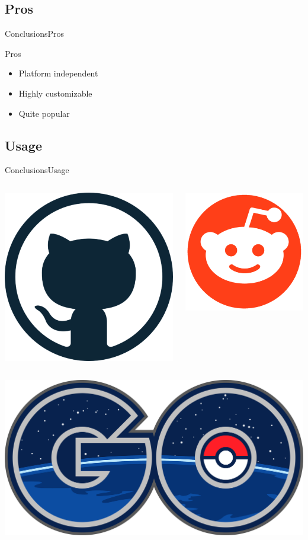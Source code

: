 \documentclass[10pt,aspectratio=169
	]{beamer}
\begin{document}
		\subsection{Pros}
		\begin{frame}{Conclusions}{Pros}
			\begin{exampleblock}{Pros}
				\begin{itemize}
					\item Platform independent
					\item Highly customizable
					\item Quite popular
				\end{itemize}
			\end{exampleblock}
		\end{frame}

		\subsection{Usage}
		\begin{frame}{Conclusions}{Usage}
			\begin{columns}
				\begin{column}{.4\textwidth}
					\href{https://github.blog/2017-08-16-kubernetes-at-github/}{\includegraphics[width=.33\linewidth,center]{images/logo-github.png}}
				\end{column}
				\begin{column}{.5\textwidth}
					\href{https://gc-taylor.com/blog/2019/11/21/recordings-slides-from-kubernetes-at-reddit-tales-from-production-at-kubecon-na-2019}{\includegraphics[width=.29\linewidth,center]{images/logo-reddit.png}}
				\end{column}
			\end{columns}
			\vspace{1em}
			\pause
			\href{https://cloud.google.com/blog/products/containers-kubernetes/bringing-pokemon-go-to-life-on-google-cloud}{\includegraphics[width=.25\linewidth,center]{images/logo-pokemon.png}}
		\end{frame}
\end{document}
